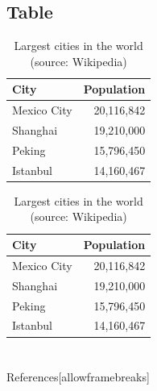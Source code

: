 \documentclass[
11pt,notheorems,hyperref={pdfauthor=Maghfira Ramadhani}
]{beamer}
\begin{document}
\subsection{Table}
\begin{frame}
    \begin{table}
        \caption{Largest cities in the world (source: Wikipedia)}
        \begin{tabular}{@{} lr @{}}
          \toprule
          City & Population\\
          \midrule
          Mexico City & 20,116,842\\
          Shanghai & 19,210,000\\
          Peking & 15,796,450\\
          Istanbul & 14,160,467\\
          \bottomrule
        \end{tabular}
        \hspace*{1cm}
            \setlength\extrarowheight{3pt}
        \begin{tabular}{|lr|}
          \hline
          \rowcolor{primary}\color{white}City & \color{white}Population\\
          \hline
          Mexico City & 20,116,842\\
          Shanghai & 19,210,000\\
          Peking & 15,796,450\\
          Istanbul & 14,160,467\\
          \hline
        \end{tabular}
    \end{table}
\end{frame}

\section{}
\begin{frame}{References}[allowframebreaks]
    \printbibliography
\end{frame}
\end{document}

